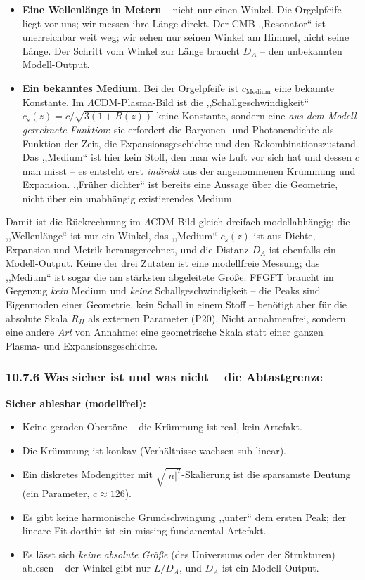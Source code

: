 \begin{itemize}
  \item \textbf{Eine Wellenlänge in Metern} -- nicht nur einen Winkel.
        Die Orgelpfeife liegt vor uns; wir messen ihre Länge direkt.
        Der CMB-,,Resonator`` ist unerreichbar weit weg; wir sehen nur
        seinen Winkel am Himmel, nicht seine Länge. Der Schritt vom
        Winkel zur Länge braucht $D_A$ -- den unbekannten Modell-Output.
  \item \textbf{Ein bekanntes Medium.} Bei der Orgelpfeife ist
        $c_\mathrm{Medium}$ eine bekannte Konstante. Im
        $\Lambda$CDM-Plasma-Bild ist die ,,Schallgeschwindigkeit``
        $c_s(z) = c/\sqrt{3(1+R(z))}$ keine Konstante, sondern eine
        \emph{aus dem Modell gerechnete Funktion}: sie erfordert die
        Baryonen- und Photonendichte als Funktion der Zeit, die
        Expansionsgeschichte und den Rekombinationszustand. Das
        ,,Medium`` ist hier kein Stoff, den man wie Luft vor sich hat
        und dessen $c$ man misst -- es entsteht erst \emph{indirekt} aus
        der angenommenen Krümmung und Expansion. ,,Früher dichter`` ist
        bereits eine Aussage über die Geometrie, nicht über ein
        unabhängig existierendes Medium.
\end{itemize}

Damit ist die Rückrechnung im $\Lambda$CDM-Bild gleich dreifach
modellabhängig: die ,,Wellenlänge`` ist nur ein Winkel, das ,,Medium``
$c_s(z)$ ist aus Dichte, Expansion und Metrik herausgerechnet, und die
Distanz $D_A$ ist ebenfalls ein Modell-Output. Keine der drei Zutaten ist
eine modellfreie Messung; das ,,Medium`` ist sogar die am stärksten
abgeleitete Größe. FFGFT braucht im Gegenzug \emph{kein} Medium und
\emph{keine} Schallgeschwindigkeit -- die Peaks sind Eigenmoden einer
Geometrie, kein Schall in einem Stoff -- benötigt aber für die absolute
Skala $R_H$ als externen Parameter (P20). Nicht annahmenfrei, sondern
eine andere \emph{Art} von Annahme: eine geometrische Skala statt einer
ganzen Plasma- und Expansionsgeschichte.

\subsubsection*{10.7.6 Was sicher ist und was nicht -- die Abtastgrenze}

\textbf{Sicher ablesbar (modellfrei):}
\begin{itemize}
  \item Keine geraden Obertöne -- die Krümmung ist real, kein Artefakt.
  \item Die Krümmung ist konkav (Verhältnisse wachsen sub-linear).
  \item Ein diskretes Modengitter mit $\sqrt{|n|^2}$-Skalierung ist die
        sparsamste Deutung (ein Parameter, $c \approx 126$).
  \item Es gibt keine harmonische Grundschwingung ,,unter`` dem ersten
        Peak; der lineare Fit dorthin ist ein missing-fundamental-Artefakt.
  \item Es lässt sich \emph{keine absolute Größe} (des Universums oder der
        Strukturen) ablesen -- der Winkel gibt nur $L/D_A$, und $D_A$ ist
        ein Modell-Output.
\end{itemize}

